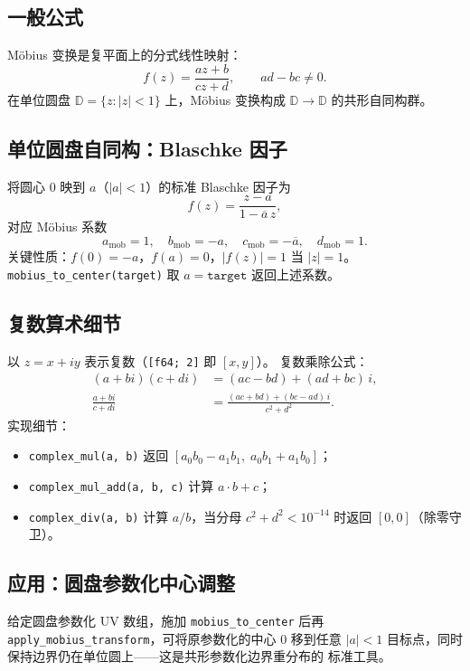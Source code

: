 \documentclass[11pt,a4paper]{article}
\begin{document}
\subsection{一般公式}

Möbius 变换是复平面上的分式线性映射：
\[
  f(z) = \frac{a z + b}{c z + d}, \qquad ad - bc \neq 0.
\]
在单位圆盘 $\mathbb{D} = \{z : |z| < 1\}$ 上，Möbius 变换构成
$\mathbb{D} \to \mathbb{D}$ 的共形自同构群。

\subsection{单位圆盘自同构：Blaschke 因子}

将圆心 $0$ 映到 $a$（$|a| < 1$）的标准 Blaschke 因子为
\[
  f(z) = \frac{z - a}{1 - \overline{a}\, z},
\]
对应 Möbius 系数
\[
  a_{\text{mob}} = 1, \quad
  b_{\text{mob}} = -a, \quad
  c_{\text{mob}} = -\overline{a}, \quad
  d_{\text{mob}} = 1.
\]
关键性质：$f(0) = -a$，$f(a) = 0$，$|f(z)| = 1$ 当 $|z| = 1$。
\texttt{mobius\_to\_center(target)} 取 $a = \texttt{target}$ 返回上述系数。

\subsection{复数算术细节}

以 $z = x + iy$ 表示复数（\texttt{[f64; 2]} 即 $[x, y]$）。
复数乘除公式：
\begin{align}
  (a + bi)(c + di) &= (ac - bd) + (ad + bc)\, i, \\
  \frac{a + bi}{c + di} &= \frac{(ac + bd) + (bc - ad)\, i}{c^2 + d^2}.
\end{align}
实现细节：
\begin{itemize}
  \item \texttt{complex\_mul(a, b)} 返回 $[a_0 b_0 - a_1 b_1,\; a_0 b_1 + a_1 b_0]$；
  \item \texttt{complex\_mul\_add(a, b, c)} 计算 $a \cdot b + c$；
  \item \texttt{complex\_div(a, b)} 计算 $a / b$，当分母 $c^2 + d^2 < 10^{-14}$
        时返回 $[0, 0]$（除零守卫）。
\end{itemize}

\subsection{应用：圆盘参数化中心调整}

给定圆盘参数化 UV 数组，施加 \texttt{mobius\_to\_center} 后再
\texttt{apply\_mobius\_transform}，可将原参数化的中心 $0$ 移到任意
$|a| < 1$ 目标点，同时保持边界仍在单位圆上——这是共形参数化边界重分布的
标准工具。
\end{document}
